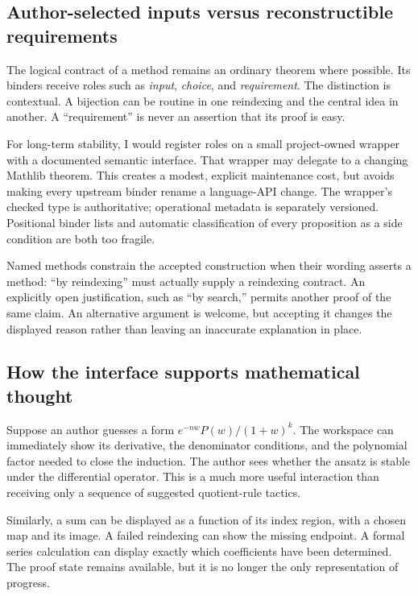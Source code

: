 \documentclass[11pt,a4paper]{article}
\theoremstyle{remark}
\begin{document}
\subsection{Author-selected inputs versus reconstructible requirements}
The logical contract of a method remains an ordinary theorem where possible.
Its binders receive roles such as \emph{input}, \emph{choice}, and
\emph{requirement}. The distinction is contextual. A bijection can be routine in
one reindexing and the central idea in another. A ``requirement'' is never an
assertion that its proof is easy.

For long-term stability, I would register roles on a small project-owned wrapper
with a documented semantic interface. That wrapper may delegate to a changing
Mathlib theorem. This creates a modest, explicit maintenance cost, but avoids
making every upstream binder rename a language-API change. The wrapper's checked
type is authoritative; operational metadata is separately versioned. Positional
binder lists and automatic classification of every proposition as a side
condition are both too fragile.

Named methods constrain the accepted construction when their wording asserts a
method: ``by reindexing'' must actually supply a reindexing contract. An explicitly
open justification, such as ``by search,'' permits another proof of the same
claim. An alternative argument is welcome, but accepting it changes the displayed
reason rather than leaving an inaccurate explanation in place.

\subsection{How the interface supports mathematical thought}
Suppose an author guesses a form $e^{-nw}P(w)/(1+w)^k$. The workspace can immediately
show its derivative, the denominator conditions, and the polynomial factor
needed to close the induction. The author sees whether the ansatz is stable under
the differential operator. This is a much more useful interaction than receiving
only a sequence of suggested quotient-rule tactics.

Similarly, a sum can be displayed as a function of its index region, with a chosen
map and its image. A failed reindexing can show the missing endpoint. A formal
series calculation can display exactly which coefficients have been determined.
The proof state remains available, but it is no longer the only representation
of progress.
\end{document}
